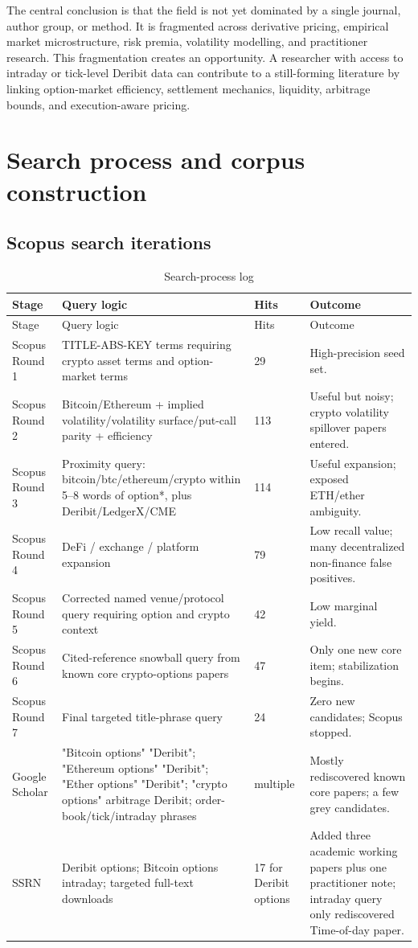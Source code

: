 \documentclass[11pt,a4paper]{article}
\begin{document}
The central conclusion is that the field is not yet dominated by a single journal, author group, or method. It is fragmented across derivative pricing, empirical market microstructure, risk premia, volatility modelling, and practitioner research. This fragmentation creates an opportunity. A researcher with access to intraday or tick-level Deribit data can contribute to a still-forming literature by linking option-market efficiency, settlement mechanics, liquidity, arbitrage bounds, and execution-aware pricing.

\clearpage
\appendix
\section{Search process and corpus construction}

\subsection{Scopus search iterations}

\begin{longtable}{p{}p{}p{}p{}}
\caption{Search-process log}\\
\toprule
Stage & Query logic & Hits & Outcome \\
\midrule
\endfirsthead
\toprule
Stage & Query logic & Hits & Outcome \\
\midrule
\endhead
Scopus Round 1 & TITLE-ABS-KEY terms requiring crypto asset terms and option-market terms & 29 & High-precision seed set. \\
Scopus Round 2 & Bitcoin/Ethereum + implied volatility/volatility surface/put-call parity + efficiency & 113 & Useful but noisy; crypto volatility spillover papers entered. \\
Scopus Round 3 & Proximity query: bitcoin/btc/ethereum/crypto within 5--8 words of option*, plus Deribit/LedgerX/CME & 114 & Useful expansion; exposed ETH/ether ambiguity. \\
Scopus Round 4 & DeFi / exchange / platform expansion & 79 & Low recall value; many decentralized non-finance false positives. \\
Scopus Round 5 & Corrected named venue/protocol query requiring option and crypto context & 42 & Low marginal yield. \\
Scopus Round 6 & Cited-reference snowball query from known core crypto-options papers & 47 & Only one new core item; stabilization begins. \\
Scopus Round 7 & Final targeted title-phrase query & 24 & Zero new candidates; Scopus stopped. \\
Google Scholar & "Bitcoin options" "Deribit"; "Ethereum options" "Deribit"; "Ether options" "Deribit"; "crypto options" arbitrage Deribit; order-book/tick/intraday phrases & multiple & Mostly rediscovered known core papers; a few grey candidates. \\
SSRN & Deribit options; Bitcoin options intraday; targeted full-text downloads & 17 for Deribit options & Added three academic working papers plus one practitioner note; intraday query only rediscovered Time-of-day paper. \\
\bottomrule
\end{longtable}
\end{document}
